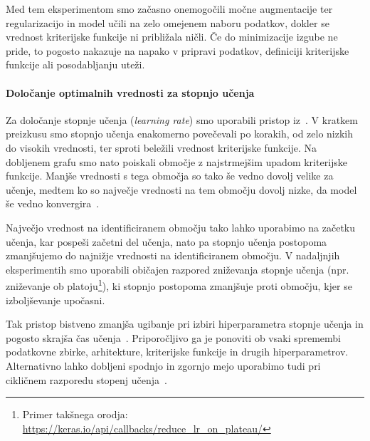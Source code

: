 \documentclass[a4paper,twoside,openright,12pt,slovene]{book}
\begin{document}
            Med tem eksperimentom smo začasno onemogočili močne augmentacije
            ter regularizacijo in model učili na zelo omejenem naboru podatkov,
            dokler se vrednost kriterijske funkcije ni približala ničli. Če do
            minimizacije izgube ne pride, to pogosto nakazuje na napako v
            pripravi podatkov, definiciji kriterijske funkcije ali
            posodabljanju uteži.

            \paragraph{Določanje optimalnih vrednosti za stopnjo učenja} \label{sct:eir-eksperimenti-dolocanje-learning-rate}

            Za določanje stopnje učenja (\textit{learning rate}) smo uporabili
            pristop iz~\cite{src:smith2017cyclical}. V kratkem preizkusu
            smo stopnjo učenja enakomerno povečevali po korakih, od zelo nizkih do
            visokih vrednosti, ter sproti beležili vrednost kriterijske
            funkcije. Na dobljenem grafu smo nato poiskali območje z najstrmejšim upadom
            kriterijske funkcije. Manjše vrednosti s tega območja so tako še
            vedno dovolj velike za učenje, medtem ko so največje vrednosti na
            tem območju dovolj nizke, da model še vedno
            konvergira~\cite{src:smith2017cyclical}.

            Največjo vrednost na identificiranem območju tako lahko uporabimo na začetku
            učenja, kar pospeši začetni del učenja, nato pa stopnjo učenja
            postopoma zmanjšujemo do najnižje vrednosti na identificiranem
            območju. V nadaljnjih eksperimentih smo uporabili običajen razpored
            zniževanja stopnje učenja (npr. zniževanje ob platoju\footnote{Primer takšnega orodja:
            \url{https://keras.io/api/callbacks/reduce_lr_on_plateau/}}), ki
            stopnjo postopoma zmanjšuje proti območju, kjer se izboljševanje
            upočasni.

            Tak pristop bistveno zmanjša ugibanje pri izbiri hiperparametra
            stopnje učenja in pogosto skrajša čas
            učenja~\cite{src:smith2017cyclical}. Priporočljivo ga je ponoviti
            ob vsaki spremembi podatkovne zbirke, arhitekture, kriterijske
            funkcije in drugih hiperparametrov. Alternativno lahko dobljeni
            spodnjo in zgornjo mejo uporabimo tudi pri cikličnem razporedu
            stopenj učenja~\cite{src:smith2017cyclical}.
\end{document}
